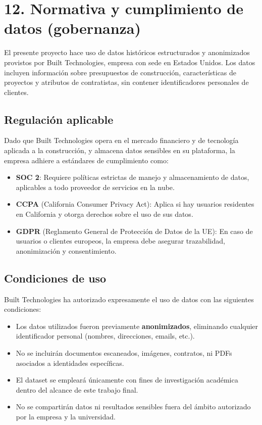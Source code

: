 \documentclass[
11pt, %
]{charter}
\begin{document}
\section{12. Normativa y cumplimiento de datos (gobernanza)}

El presente proyecto hace uso de datos históricos estructurados y anonimizados provistos por Built Technologies, empresa con sede en Estados Unidos. Los datos incluyen información sobre presupuestos de construcción, características de proyectos y atributos de contratistas, sin contener identificadores personales de clientes.

\subsection*{Regulación aplicable}

Dado que Built Technologies opera en el mercado financiero y de tecnología aplicada a la construcción, y almacena datos sensibles en su plataforma, la empresa adhiere a estándares de cumplimiento como:

\begin{itemize}
    \item \textbf{SOC 2}: Requiere políticas estrictas de manejo y almacenamiento de datos, aplicables a todo proveedor de servicios en la nube.
    \item \textbf{CCPA} (California Consumer Privacy Act): Aplica si hay usuarios residentes en California y otorga derechos sobre el uso de sus datos.
    \item \textbf{GDPR} (Reglamento General de Protección de Datos de la UE): En caso de usuarios o clientes europeos, la empresa debe asegurar trazabilidad, anonimización y consentimiento.
\end{itemize}

\subsection*{Condiciones de uso}

Built Technologies ha autorizado expresamente el uso de datos con las siguientes condiciones:

\begin{itemize}
    \item Los datos utilizados fueron previamente \textbf{anonimizados}, eliminando cualquier identificador personal (nombres, direcciones, emails, etc.).
    \item No se incluirán documentos escaneados, imágenes, contratos, ni PDFs asociados a identidades específicas.
    \item El dataset se empleará únicamente con fines de investigación académica dentro del alcance de este trabajo final.
    \item No se compartirán datos ni resultados sensibles fuera del ámbito autorizado por la empresa y la universidad.
\end{itemize}
\end{document}

